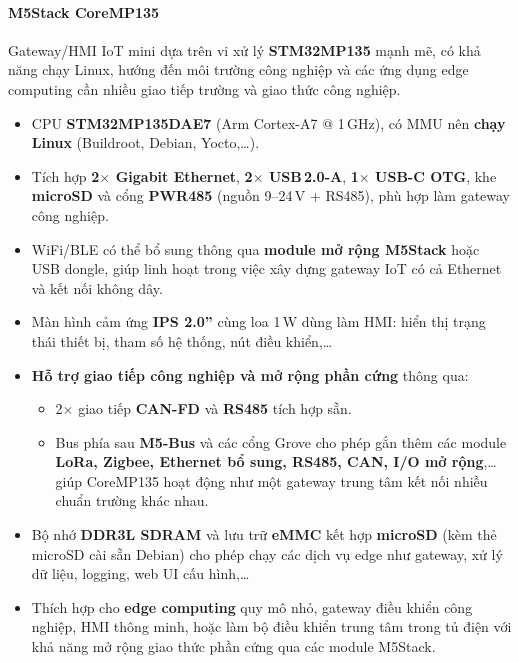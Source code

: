                 \paragraph*{M5Stack CoreMP135}
                    Gateway/HMI IoT mini dựa trên vi xử lý \textbf{STM32MP135} mạnh mẽ, có khả năng chạy Linux, hướng đến môi trường công nghiệp và các ứng dụng edge computing cần nhiều giao tiếp trường và giao thức công nghiệp.
                    \begin{itemize}
                        \item CPU \textbf{STM32MP135DAE7} (Arm Cortex-A7 @ 1\,GHz), có MMU nên \textbf{chạy Linux} (Buildroot, Debian, Yocto,\dots).
                        \item Tích hợp \textbf{2$\times$ Gigabit Ethernet}, \textbf{2$\times$ USB\,2.0-A}, \textbf{1$\times$ USB-C OTG}, khe \textbf{microSD} và cổng \textbf{PWR485} (nguồn 9--24\,V + RS485), phù hợp làm gateway công nghiệp.
                        \item WiFi/BLE có thể bổ sung thông qua \textbf{module mở rộng M5Stack} hoặc USB dongle, giúp linh hoạt trong việc xây dựng gateway IoT có cả Ethernet và kết nối không dây.
                        \item Màn hình cảm ứng \textbf{IPS 2.0''} cùng loa 1\,W dùng làm HMI: hiển thị trạng thái thiết bị, tham số hệ thống, nút điều khiển,\dots
                        \item \textbf{Hỗ trợ giao tiếp công nghiệp và mở rộng phần cứng} thông qua:
                        \begin{itemize}
                            \item 2$\times$ giao tiếp \textbf{CAN-FD} và \textbf{RS485} tích hợp sẵn.
                            \item Bus phía sau \textbf{M5-Bus} và các cổng Grove cho phép gắn thêm các module \textbf{LoRa, Zigbee, Ethernet bổ sung, RS485, CAN, I/O mở rộng},\dots giúp CoreMP135 hoạt động như một gateway trung tâm kết nối nhiều chuẩn trường khác nhau.
                        \end{itemize}
                        \item Bộ nhớ \textbf{DDR3L SDRAM} và lưu trữ \textbf{eMMC} kết hợp \textbf{microSD} (kèm thẻ microSD cài sẵn Debian) cho phép chạy các dịch vụ edge như gateway, xử lý dữ liệu, logging, web UI cấu hình,\dots
                        \item Thích hợp cho \textbf{edge computing} quy mô nhỏ, gateway điều khiển công nghiệp, HMI thông minh, hoặc làm bộ điều khiển trung tâm trong tủ điện với khả năng mở rộng giao thức phần cứng qua các module M5Stack.
                    \end{itemize}
